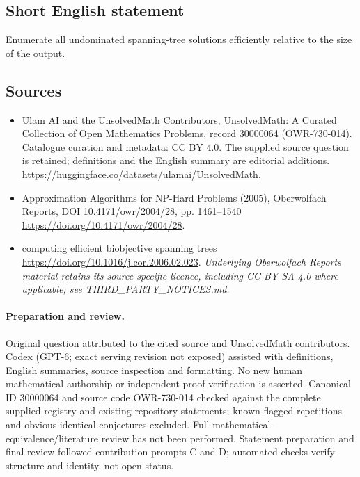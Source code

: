 \documentclass[11pt]{article}
\begin{document}
\subsection{Short English statement}
Enumerate all undominated spanning-tree solutions efficiently relative to the size of the output.
\subsection{Sources}
\begin{itemize}
\item[\hypertarget{source:30000064:1}{S1}] Ulam AI and the UnsolvedMath Contributors, UnsolvedMath: A Curated Collection of Open Mathematics Problems, record 30000064 (OWR-730-014). Catalogue curation and metadata: CC BY 4.0. The supplied source question is retained; definitions and the English summary are editorial additions.
\url{https://huggingface.co/datasets/ulamai/UnsolvedMath}.
\item[\hypertarget{source:30000064:2}{S2}] Approximation Algorithms for NP-Hard Problems (2005), Oberwolfach Reports, DOI 10.4171/owr/2004/28, pp. 1461--1540
\url{https://doi.org/10.4171/owr/2004/28}.
\item[\hypertarget{source:30000064:3}{S3}] computing efficient biobjective spanning trees
\url{https://doi.org/10.1016/j.cor.2006.02.023}.
\textit{Underlying Oberwolfach Reports material retains its source-specific licence, including CC BY-SA 4.0 where applicable; see THIRD\_PARTY\_NOTICES.md.}
\end{itemize}
\paragraph{Preparation and review.}
Original question attributed to the cited source and UnsolvedMath contributors. Codex (GPT-6; exact serving revision not exposed) assisted with definitions, English summaries, source inspection and formatting. No new human mathematical authorship or independent proof verification is asserted. Canonical ID 30000064 and source code OWR-730-014 checked against the complete supplied registry and existing repository statements; known flagged repetitions and obvious identical conjectures excluded. Full mathematical-equivalence/literature review has not been performed. Statement preparation and final review followed contribution prompts C and D; automated checks verify structure and identity, not open status.
\label{end:30000064}
\end{document}
